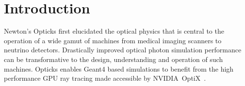 \documentclass[a4paper]{jpconf}
\begin{document}
%
%
%
%
%
%
%
%
%
%
  

\section{Introduction}

Newton's Opticks\cite{newton} first elucidated the optical physics 
that is central to the operation of a wide gamut of machines from medical imaging 
scanners to neutrino detectors. Drastically improved optical photon simulation 
performance can be transformative to the design, understanding 
and operation of such machines. Opticks\cite{opticksURL} enables Geant4\cite{g4A}\cite{g4B}\cite{g4C}
based simulations to benefit from the high performance GPU ray tracing made accessible
by NVIDIA\textregistered\ OptiX\texttrademark\ \cite{optixPaper}\cite{optixSite}.
\end{document}
